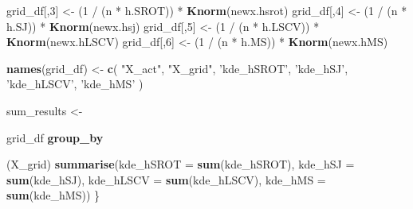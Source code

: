 \documentclass[]{article}
\newenvironment{Shaded}{\begin{snugshade}}{\end{snugshade}}
\newcommand{\KeywordTok}[1]{\textcolor[rgb]{0.13,0.29,0.53}{\textbf{{#1}}}}
\newcommand{\DataTypeTok}[1]{\textcolor[rgb]{0.13,0.29,0.53}{{#1}}}
\newcommand{\DecValTok}[1]{\textcolor[rgb]{0.00,0.00,0.81}{{#1}}}
\newcommand{\StringTok}[1]{\textcolor[rgb]{0.31,0.60,0.02}{{#1}}}
\newcommand{\NormalTok}[1]{{#1}}
\begin{document}
\begin{Shaded}
\begin{Highlighting}[]
        \NormalTok{grid_df[,}\DecValTok{3}\NormalTok{] <-}\StringTok{ }\NormalTok{(}\DecValTok{1} \NormalTok{/}\StringTok{ }\NormalTok{(n *}\StringTok{ }\NormalTok{h.SROT)) *}\StringTok{ }\KeywordTok{Knorm}\NormalTok{(newx.hsrot)}
        \NormalTok{grid_df[,}\DecValTok{4}\NormalTok{] <-}\StringTok{ }\NormalTok{(}\DecValTok{1} \NormalTok{/}\StringTok{ }\NormalTok{(n *}\StringTok{ }\NormalTok{h.SJ)) *}\StringTok{ }\KeywordTok{Knorm}\NormalTok{(newx.hsj)}
        \NormalTok{grid_df[,}\DecValTok{5}\NormalTok{] <-}\StringTok{ }\NormalTok{(}\DecValTok{1} \NormalTok{/}\StringTok{ }\NormalTok{(n *}\StringTok{ }\NormalTok{h.LSCV)) *}\StringTok{ }\KeywordTok{Knorm}\NormalTok{(newx.hLSCV)}
        \NormalTok{grid_df[,}\DecValTok{6}\NormalTok{] <-}\StringTok{ }\NormalTok{(}\DecValTok{1} \NormalTok{/}\StringTok{ }\NormalTok{(n *}\StringTok{ }\NormalTok{h.MS)) *}\StringTok{ }\KeywordTok{Knorm}\NormalTok{(newx.hMS)}
        
        \KeywordTok{names}\NormalTok{(grid_df) <-}\StringTok{ }\KeywordTok{c}\NormalTok{(}
            \StringTok{"X_act"}\NormalTok{, }
            \StringTok{"X_grid"}\NormalTok{, }
            \StringTok{'kde_hSROT'}\NormalTok{,}
            \StringTok{'kde_hSJ'}\NormalTok{,}
            \StringTok{'kde_hLSCV'}\NormalTok{,}
            \StringTok{'kde_hMS'}
        \NormalTok{)}
        
        \NormalTok{sum_results <-}\StringTok{ }
\StringTok{            }\NormalTok{grid_df %
\StringTok{            }\KeywordTok{group_by}\NormalTok{(X_grid) %
\StringTok{            }\KeywordTok{summarise}\NormalTok{(}\DataTypeTok{kde_hSROT =} \KeywordTok{sum}\NormalTok{(kde_hSROT),}
                      \DataTypeTok{kde_hSJ =} \KeywordTok{sum}\NormalTok{(kde_hSJ),}
                      \DataTypeTok{kde_hLSCV =} \KeywordTok{sum}\NormalTok{(kde_hLSCV),}
                      \DataTypeTok{kde_hMS =} \KeywordTok{sum}\NormalTok{(kde_hMS))}
    \NormalTok{\}}
    
}}
\end{Highlighting}
\end{Shaded}
\end{document}
